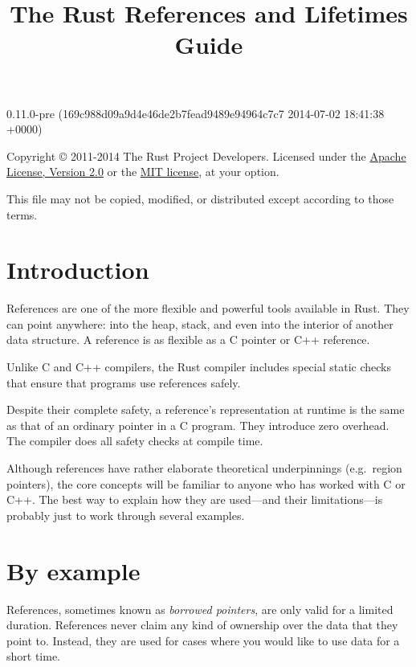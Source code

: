 \documentclass[]{article}
\title{The Rust References and Lifetimes Guide}
\begin{document}
\maketitle

0.11.0-pre (169c988d09a9d4e46de2b7fead9489e94964c7c7 2014-07-02 18:41:38 +0000)

Copyright © 2011-2014 The Rust Project Developers. Licensed under the
\href{http://www.apache.org/licenses/LICENSE-2.0}{Apache License,
Version 2.0} or the \href{http://opensource.org/licenses/MIT}{MIT
license}, at your option.

This file may not be copied, modified, or distributed except according
to those terms.

{
\hypersetup{linkcolor=black}
\setcounter{tocdepth}{3}
\tableofcontents
}
\section{Introduction}\label{introduction}

References are one of the more flexible and powerful tools available in
Rust. They can point anywhere: into the heap, stack, and even into the
interior of another data structure. A reference is as flexible as a C
pointer or C++ reference.

Unlike C and C++ compilers, the Rust compiler includes special static
checks that ensure that programs use references safely.

Despite their complete safety, a reference's representation at runtime
is the same as that of an ordinary pointer in a C program. They
introduce zero overhead. The compiler does all safety checks at compile
time.

Although references have rather elaborate theoretical underpinnings
(e.g.~region pointers), the core concepts will be familiar to anyone who
has worked with C or C++. The best way to explain how they are
used---and their limitations---is probably just to work through several
examples.

\section{By example}\label{by-example}

References, sometimes known as \emph{borrowed pointers}, are only valid
for a limited duration. References never claim any kind of ownership
over the data that they point to. Instead, they are used for cases where
you would like to use data for a short time.
\end{document}
